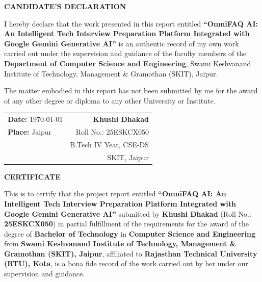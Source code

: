 \documentclass[12pt,a4paper]{report}
\begin{document}
\setcounter{page}{1}

\begin{center}
    {\LARGE \textbf{\textcolor{skitnavy}{CANDIDATE'S DECLARATION}}}
\end{center}
\vspace{1.5cm}

I hereby declare that the work presented in this report entitled \textbf{``OmniFAQ AI: An Intelligent Tech Interview Preparation Platform Integrated with Google Gemini Generative AI''} is an authentic record of my own work carried out under the supervision and guidance of the faculty members of the \textbf{Department of Computer Science and Engineering}, Swami Keshvanand Institute of Technology, Management \& Gramothan (SKIT), Jaipur.

The matter embodied in this report has not been submitted by me for the award of any other degree or diploma to any other University or Institute.

\vspace{3cm}

\noindent
\begin{tabularx}{\textwidth}{Xr}
\textbf{Date:} \today & \textbf{Khushi Dhakad} \\
\textbf{Place:} Jaipur & Roll No.: 25ESKCX050 \\
& B.Tech IV Year, CSE-DS \\
& SKIT, Jaipur \\
\end{tabularx}
\clearpage

\begin{center}
    {\LARGE \textbf{\textcolor{skitnavy}{CERTIFICATE}}}
\end{center}
\vspace{1.5cm}

This is to certify that the project report entitled \textbf{``OmniFAQ AI: An Intelligent Tech Interview Preparation Platform Integrated with Google Gemini Generative AI''} submitted by \textbf{Khushi Dhakad} (Roll No.: \textbf{25ESKCX050}) in partial fulfillment of the requirements for the award of the degree of \textbf{Bachelor of Technology} in \textbf{Computer Science and Engineering} from \textbf{Swami Keshvanand Institute of Technology, Management \& Gramothan (SKIT), Jaipur}, affiliated to \textbf{Rajasthan Technical University (RTU), Kota}, is a bona fide record of the work carried out by her under our supervision and guidance.
\end{document}
